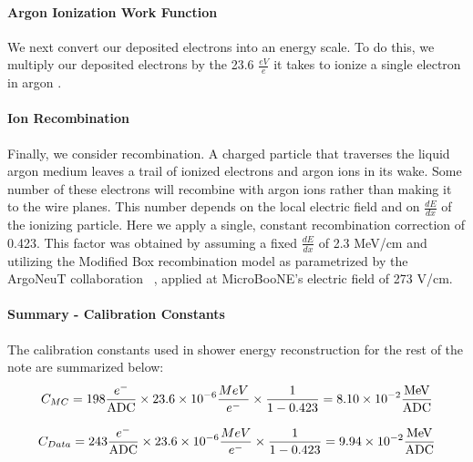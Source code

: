 \paragraph{Argon Ionization Work Function} We next convert our deposited electrons into an energy scale. To do this, we multiply our deposited electrons by the 23.6 $\frac{eV}{e}$ it takes to ionize a single electron in argon \cite{bib:ionization_per_electron}. 
\paragraph{Ion Recombination} Finally, we consider recombination.  A charged particle that traverses the liquid argon medium leaves a trail of ionized electrons and argon ions in its wake.  Some number of these electrons will recombine with argon ions rather than making it to the wire planes. This number depends on the local electric field and on $\frac{dE}{dx}$ of the ionizing particle. Here we apply a single, constant recombination correction of 0.423. This factor was obtained by assuming a fixed $\frac{dE}{dx}$ of 2.3 MeV/cm  and utilizing the Modified Box recombination model as parametrized by the ArgoNeuT collaboration ~\cite{bib:argoneut_recomb}, applied at MicroBooNE's electric field of 273 V/cm.  
\paragraph{Summary - Calibration Constants}
The calibration constants used in shower energy reconstruction for the rest of the note are summarized below:
\begin{equation}
  C_{MC} = 198 \frac{e^-}{\rm ADC} \times 23.6 \times 10^{-6} \frac{MeV}{e^-} \times \frac{1}{1-0.423} = 8.10 \times 10^{-2} \frac{\rm MeV}{\rm ADC}
\end{equation}

\begin{equation}
  C_{Data} = 243 \frac{e^-}{\rm ADC} \times 23.6 \times 10^{-6} \frac{MeV}{e^-} \times \frac{1}{1-0.423} = 9.94 \times 10^{-2} \frac{\rm MeV}{\rm ADC}
\end{equation}


